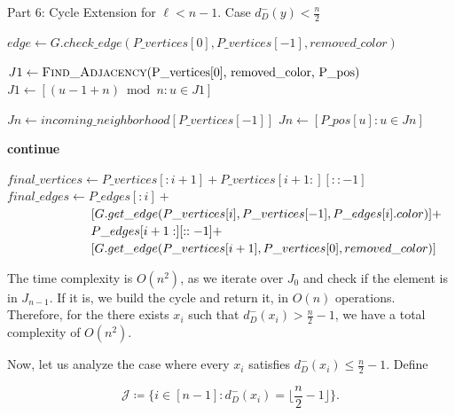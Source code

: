 \begin{algorithm}[H]
    \caption{Part 6: Cycle Extension for \( \ell < n - 1 \). Case \( d^-_D(y) < \frac{n}{2} \)}
    \begin{algorithmic}[1]
            \State $edge \gets G.check\_edge(P\_vertices[0], P\_vertices[-1], removed\_color)$
                \State \Return {}
            \EndIf

            \State $J1 \gets \Call{Find\_Adjacency}{$P\_vertices[0], removed\_color, P\_pos$}$
            \State $J1 \gets [(u - 1 + n) \bmod n : u \in J1]$

            \State $Jn \gets incoming\_neighborhood[P\_vertices[-1]]$
            \State $Jn \gets [P\_pos[u] : u \in Jn]$

                        \State \textbf{continue}
                    \EndIf

                    \State $final\_vertices \gets P\_vertices[:i+1] + P\_vertices[i+1:][::-1]$
                    \State $final\_edges \gets P\_edges[:i] +$
                    \State $\hspace{6.7em} [G.get\_edge(P\_vertices[i], P\_vertices[-1], P\_edges[i].color)] +$
                    \State $\hspace{6.7em} P\_edges[i+1:][::-1] +$
                    \State $\hspace{6.7em} [G.get\_edge(P\_vertices[i+1], P\_vertices[0], removed\_color)]$

                    \State \Return {}
                \EndIf
            \EndFor
        \EndFunction
    \end{algorithmic}
\end{algorithm}

The time complexity is $O(n^2)$, as we iterate over $J_0$ and check 
if the element is in $J_{n-1}$. If it is, we build the cycle and return it, in $O(n)$ operations.
Therefore, for the there exists $x_i$ such that $d^-_D(x_i) > \frac{n}{2} - 1$, we have a total 
complexity of $O(n^2)$.

Now, let us analyze the case where every $x_i$ satisfies $d^-_D(x_i) \leq \frac{n}{2} - 1$.
Define

\begin{equation}
    \mathcal{J} \coloneqq \{i \in [n-1]: d^-_D(x_i) = \lfloor \frac{n}{2} - 1 \rfloor\}.
    \label{eq:J_definition}
\end{equation}

